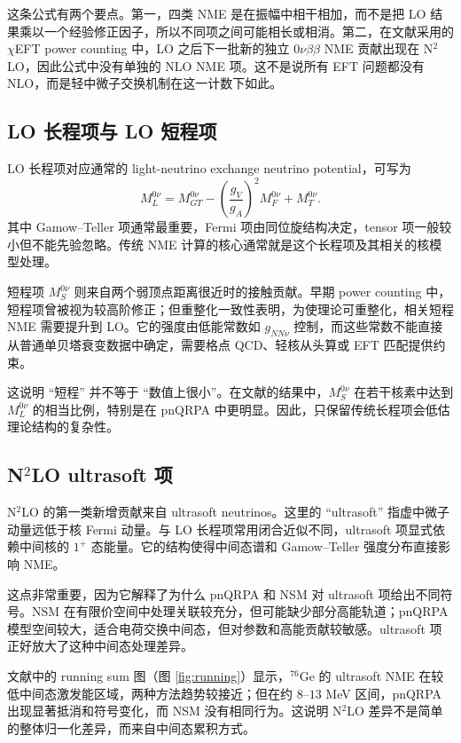 \documentclass[12pt,a4paper]{ctexart}
\begin{document}
这条公式有两个要点。第一，四类 NME 是在振幅中相干相加，而不是把 LO 结果乘以一个经验修正因子，所以不同项之间可能相长或相消。第二，在文献\cite{Castillo2025}采用的 $\chi$EFT power counting 中，LO 之后下一批新的独立 $0\nu\beta\beta$ NME 贡献出现在 N$^2$LO，因此公式中没有单独的 NLO NME 项。这不是说所有 EFT 问题都没有 NLO，而是轻中微子交换机制在这一计数下如此。

\subsection{LO 长程项与 LO 短程项}

LO 长程项对应通常的 light-neutrino exchange neutrino potential，可写为
\begin{equation}
	M_L^{0\nu}
	=
	M_{GT}^{0\nu}
	-
	\left(\frac{g_V}{g_A}\right)^2M_F^{0\nu}
	+M_T^{0\nu}.
\end{equation}
其中 Gamow--Teller 项通常最重要，Fermi 项由同位旋结构决定，tensor 项一般较小但不能先验忽略。传统 NME 计算的核心通常就是这个长程项及其相关的核模型处理。

短程项 $M_S^{0\nu}$ 则来自两个弱顶点距离很近时的接触贡献。早期 power counting 中，短程项曾被视为较高阶修正；但重整化一致性表明，为使理论可重整化，相关短程 NME 需要提升到 LO。它的强度由低能常数如 $g_{NN\nu}$ 控制，而这些常数不能直接从普通单贝塔衰变数据中确定，需要格点 QCD、轻核从头算或 EFT 匹配提供约束。

这说明 ``短程'' 并不等于 ``数值上很小''。在文献\cite{Castillo2025}的结果中，$M_S^{0\nu}$ 在若干核素中达到 $M_L^{0\nu}$ 的相当比例，特别是在 pnQRPA 中更明显。因此，只保留传统长程项会低估理论结构的复杂性。

\subsection{N\texorpdfstring{$^2$}{2}LO ultrasoft 项}

N$^2$LO 的第一类新增贡献来自 ultrasoft neutrinos。这里的 ``ultrasoft'' 指虚中微子动量远低于核 Fermi 动量。与 LO 长程项常用闭合近似不同，ultrasoft 项显式依赖中间核的 $1^+$ 态能量。它的结构使得中间态谱和 Gamow--Teller 强度分布直接影响 NME。

这点非常重要，因为它解释了为什么 pnQRPA 和 NSM 对 ultrasoft 项给出不同符号。NSM 在有限价空间中处理关联较充分，但可能缺少部分高能轨道；pnQRPA 模型空间较大，适合电荷交换中间态，但对参数和高能贡献较敏感。ultrasoft 项正好放大了这种中间态处理差异。

文献\cite{Castillo2025}中的 running sum 图（图 \ref{fig:running}）显示，$^{76}$Ge 的 ultrasoft NME 在较低中间态激发能区域，两种方法趋势较接近；但在约 $8$--$13$ MeV 区间，pnQRPA 出现显著抵消和符号变化，而 NSM 没有相同行为。这说明 N$^2$LO 差异不是简单的整体归一化差异，而来自中间态累积方式。
\end{document}
